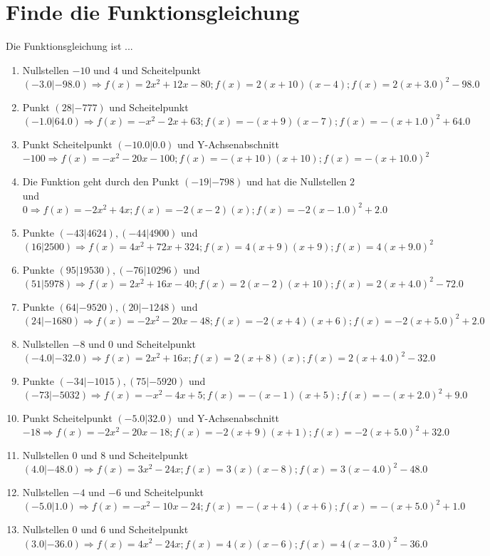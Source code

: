 \documentclass{article}%
\begin{document}
%
\section{Finde die Funktionsgleichung}%
\label{sec:FindedieFunktionsgleichung}%
Die Funktionsgleichung ist ...%
\begin{enumerate}[label=\alph*)]%
\item%
 Nullstellen $-10$ und $4$ und Scheitelpunkt $(-3.0|-98.0) \Rightarrow f(x)=2x^2 + 12x - 80 ; f(x)=2(x+10)(x-4) ; f(x)=2(x+3.0)^2 -98.0$%
\item%
 Punkt $(28|-777)$ und Scheitelpunkt $(-1.0|64.0) \Rightarrow f(x)=-x^2 - 2x + 63 ; f(x)=-(x+9)(x-7) ; f(x)=-(x+1.0)^2 +64.0$%
\item%
 Punkt Scheitelpunkt $(-10.0|0.0)$ und Y-Achsenabschnitt $-100 \Rightarrow f(x)=-x^2 - 20x - 100 ; f(x)=-(x+10)(x+10) ; f(x)=-(x+10.0)^2$%
\item%
 Die Funktion geht durch den Punkt $(-19|-798)$ und hat die Nullstellen $2$ und $0 \Rightarrow f(x)=-2x^2 + 4x ; f(x)=-2(x-2)(x) ; f(x)=-2(x-1.0)^2 +2.0$%
\item%
 Punkte $(-43|4624),(-44|4900)$ und $(16|2500) \Rightarrow f(x)=4x^2 + 72x + 324 ; f(x)=4(x+9)(x+9) ; f(x)=4(x+9.0)^2$%
\item%
 Punkte $(95|19530),(-76|10296)$ und $(51|5978) \Rightarrow f(x)=2x^2 + 16x - 40 ; f(x)=2(x-2)(x+10) ; f(x)=2(x+4.0)^2 -72.0$%
\item%
 Punkte $(64|-9520),(20|-1248)$ und $(24|-1680) \Rightarrow f(x)=-2x^2 - 20x - 48 ; f(x)=-2(x+4)(x+6) ; f(x)=-2(x+5.0)^2 +2.0$%
\item%
 Nullstellen $-8$ und $0$ und Scheitelpunkt $(-4.0|-32.0) \Rightarrow f(x)=2x^2 + 16x ; f(x)=2(x+8)(x) ; f(x)=2(x+4.0)^2 -32.0$%
\item%
 Punkte $(-34|-1015),(75|-5920)$ und $(-73|-5032) \Rightarrow f(x)=-x^2 - 4x + 5 ; f(x)=-(x-1)(x+5) ; f(x)=-(x+2.0)^2 +9.0$%
\item%
 Punkt Scheitelpunkt $(-5.0|32.0)$ und Y-Achsenabschnitt $-18 \Rightarrow f(x)=-2x^2 - 20x - 18 ; f(x)=-2(x+9)(x+1) ; f(x)=-2(x+5.0)^2 +32.0$%
\item%
 Nullstellen $0$ und $8$ und Scheitelpunkt $(4.0|-48.0) \Rightarrow f(x)=3x^2 - 24x ; f(x)=3(x)(x-8) ; f(x)=3(x-4.0)^2 -48.0$%
\item%
 Nullstellen $-4$ und $-6$ und Scheitelpunkt $(-5.0|1.0) \Rightarrow f(x)=-x^2 - 10x - 24 ; f(x)=-(x+4)(x+6) ; f(x)=-(x+5.0)^2 +1.0$%
\item%
 Nullstellen $0$ und $6$ und Scheitelpunkt $(3.0|-36.0) \Rightarrow f(x)=4x^2 - 24x ; f(x)=4(x)(x-6) ; f(x)=4(x-3.0)^2 -36.0$%

\end{enumerate}
\end{document}
